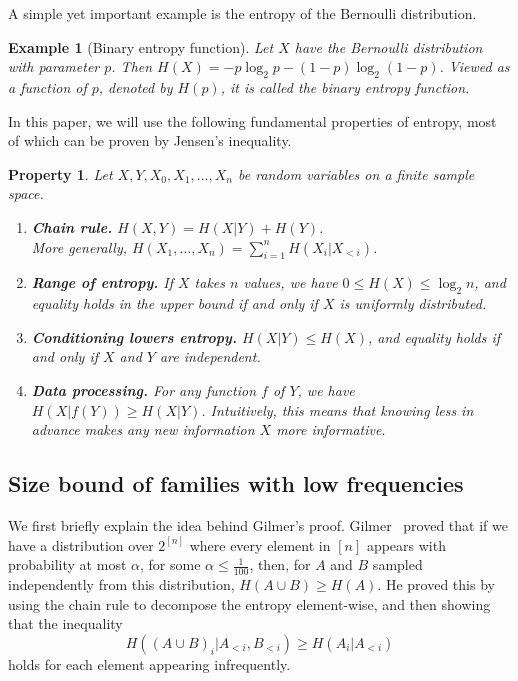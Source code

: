 \documentclass[a4paper,12pt]{article}
\theoremstyle{mystyle}	%
\newtheorem{example}[theorem]{Example}
\newtheorem{property}[theorem]{Property}
\theoremstyle{definition}
\newcommand{\6}{\partial}
\begin{document}
A simple yet important example is the entropy of the Bernoulli distribution.
\begin{example}[Binary entropy function]
    Let $X$ have the Bernoulli distribution with parameter $p$. Then $H(X)=-p\log_2p -(1-p)\log_2(1-p)$. Viewed as a function of $p$, denoted by $H(p)$, it is called the \emph{binary entropy function}.
\end{example}

In this paper, we will use the following fundamental properties of entropy, most of which can be proven by Jensen's inequality.

\begin{property} \label{property:entropy}
    Let $X, Y, X_0, X_1, \dotsc, X_n$ be random variables on a finite sample space.
    \begin{enumerate}
        \item \textbf{Chain rule.} $H(X,Y)=H(X|Y)+H(Y)$.\\
        More generally, $H(X_1,\dotsc,X_n) = \sum_{i=1}^{n} H(X_i| X_{<i})$. 
        
        \item \textbf{Range of entropy.}
        If $X$ takes $n$ values, we have $0 \le H(X)\leq \log_2 n$, and equality holds in the upper bound if and only if $X$ is uniformly distributed.
        
        \item \textbf{Conditioning lowers entropy.} $H(X|Y) \leq H(X)$, and equality holds if and only if $X$ and $Y$ are independent.
        
        \item \textbf{Data processing.} For any function $f$ of $Y$, we have $H(X|f(Y)) \ge H(X|Y)$. Intuitively, this means that knowing less in advance makes any new information $X$ more informative.
    \end{enumerate}    
\end{property}

\subsection{Size bound of families with low frequencies}
	
    We first briefly explain the idea behind Gilmer's proof. Gilmer~\cite{gilmer2022constant} proved that if we have a distribution over $2^{[n]}$ where every element in $[n]$ appears with probability  at most $\alpha$, for some $\alpha \le \frac{1}{100}$, then, for $A$ and $B$ sampled independently from this distribution, $H(A \cup B) \ge H(A)$. He proved this by using the chain rule to decompose the entropy element-wise, and then showing that the inequality 
    \[ H((A\cup B)_i|A_{< i},B_{<i})\geq H(A_i|A_{< i})\]
    holds for each element appearing infrequently. 
    
\end{document}
